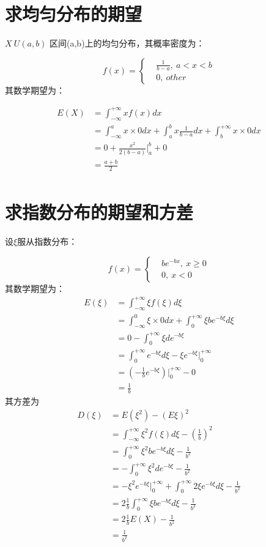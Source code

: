 \documentclass{article}
\date{\today}
\begin{document}
\makecover
\section*{求均匀分布的期望}
$X~U(a,b)$
区间(a,b)上的均匀分布，其概率密度为：

\begin{equation}
	f(x) = \left\{
	\begin{aligned}
		&\frac{1}{b-a} ,\ a< x < b\\
		&0,\ other
	\end{aligned}
	\right.
\end{equation}
其数学期望为：

\begin{align*}
E(X) &= \int^{+\infty}_{-\infty}xf(x)dx \\
&=\int_{-\infty}^{a} x\times 0dx+\int_{a}^{b}x\frac{1}{b-a}dx + \int_{b}^{+\infty} x\times0dx\\
&=0+\frac{x^2}{2(b-a)}|_{a}^{b}+0\\
&=\frac{a+b}{2}\\
\end{align*}
\section*{求指数分布的期望和方差}
设$\xi$服从指数分布：

\begin{equation}
	f(x)=\left\{
	\begin{aligned}
		& be^{-bx},\ x\geq 0\\
		& 0,\ x< 0
	\end{aligned}
	\right.
\end{equation}
其数学期望为：
\begin{align*}
E(\xi)&=\int_{-\infty}^{+\infty}\xi f(\xi)d\xi\\
&=\int_{-\infty}^{0}\xi\times0dx + \int_{0}^{+\infty}\xi b e^{-b \xi}d\xi\\
&=0-\int_{0}^{+\infty}\xi d e^{-b\xi}\\
&=\int_{0}^{+\infty} e^{-b\xi}d\xi -\xi e^{-b\xi}|_{0}^{+\infty}\\
&=(-\frac{1}{b}e^{-b\xi}) |_{0}^{+\infty}-0\\
&=\frac{1}{b}
\end{align*}
其方差为
\begin{align*}
D(\xi)&=E(\xi ^2)-(E\xi)^2\\
&=\int_{-\infty}^{+\infty}\xi ^2f(\xi)d\xi - (\frac{1}{b})^2 \\
&= \int_{0}^{+\infty}\xi ^2b e^{-b \xi}d\xi - \frac{1}{b^2}\\
&= -\int_{0}^{+\infty}\xi ^2de^{-b\xi} - \frac{1}{b^2}\\
&= - \xi ^2e^{-b\xi}|_{0}^{+\infty}+\int_{0}^{+\infty}2\xi e^{-b\xi}d\xi - \frac{1}{b^2}\\
&=2\frac{1}{b} \int_{0}^{+\infty}\xi b e^{-b\xi}d\xi -\frac{1}{b^2}\\
&=2\frac{1}{b}E(X)-\frac{1}{b^2}\\
&=\frac{1}{b^2}\\
\end{align*}
\end{document}
